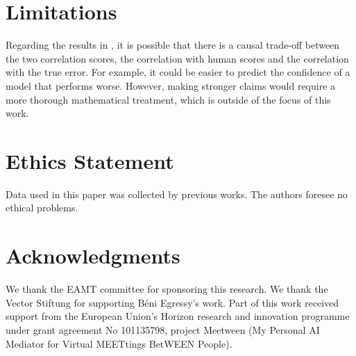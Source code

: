 \section*{Limitations}

Regarding the results in , it is possible that there is a causal trade-off between the two correlation scores, the correlation with human scores and the correlation with the true error.
For example, it could be easier to predict the confidence of a model that performs worse.
However, making stronger claims would require a more thorough mathematical treatment, which is outside of the focus of this work.


\section*{Ethics Statement}
Data used in this paper was collected by previous works.
The authors foresee no ethical problems.

\section*{Acknowledgments}

We thank the EAMT committee for sponsoring this research. 
We thank the Vector Stiftung for supporting Béni Egressy's work.
Part of this work received support from the European Union’s Horizon research and
innovation programme under grant agreement No 101135798, project Meetween (My Personal AI Mediator for Virtual MEETtings BetWEEN People).
